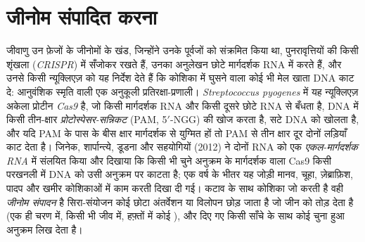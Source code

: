 \section{जीनोम संपादित करना}

\begin{definition}\label{def:b3:genetic-engineering:crispr}
जीवाणु उन फ़ेजों के जीनोमों के खंड, जिन्होंने उनके पूर्वजों को संक्रमित
किया था, पुनरावृत्तियों की किसी शृंखला (\emph{CRISPR}) में सँजोकर रखते
हैं, उनका अनुलेखन छोटे मार्गदर्शक RNA में करते हैं, और उनसे किसी
न्यूक्लिएज़ को यह निर्देश देते हैं कि कोशिका में घुसने वाला कोई भी मेल
खाता DNA काट दे: आनुवंशिक स्मृति वाली एक अनुकूली प्रतिरक्षा-प्रणाली।
\emph{Streptococcus pyogenes} में यह न्यूक्लिएज़ अकेला प्रोटीन
\emph{Cas9} है, जो किसी मार्गदर्शक RNA और किसी दूसरे छोटे RNA से बँधता
है, DNA में किसी तीन-क्षार \emph{प्रोटोस्पेसर-सन्निकट }
(PAM, 5$'$-NGG) की खोज करता है, सटे DNA को खोलता है, और यदि PAM के पास
के बीस क्षार मार्गदर्शक से युग्मित हों तो PAM से तीन क्षार दूर दोनों
लड़ियाँ काट देता है। जिनेक, शार्पान्त्ये, डूडना और सहयोगियों (2012) ने
दोनों RNA को एक \emph{एकल-मार्गदर्शक RNA} में संलयित किया और दिखाया कि
किसी भी चुने अनुक्रम के मार्गदर्शक वाला Cas9 किसी परखनली में DNA को
उसी अनुक्रम पर काटता है; एक वर्ष के भीतर यह जोड़ी मानव, चूहा,
ज़ेब्राफ़िश, पादप और खमीर कोशिकाओं में काम करती दिखा दी गई। कटाव के
साथ कोशिका जो करती है वही \emph{जीनोम संपादन} है
सिरा-संयोजन कोई छोटा अंतर्वेशन या विलोपन छोड़ जाता है जो जीन को तोड़
देता है (एक ही चरण में, किसी भी जीव में, हफ़्तों में कोई ),
और दिए गए किसी साँचे के साथ  कोई चुना हुआ अनुक्रम लिख
देता है।
\end{definition}

